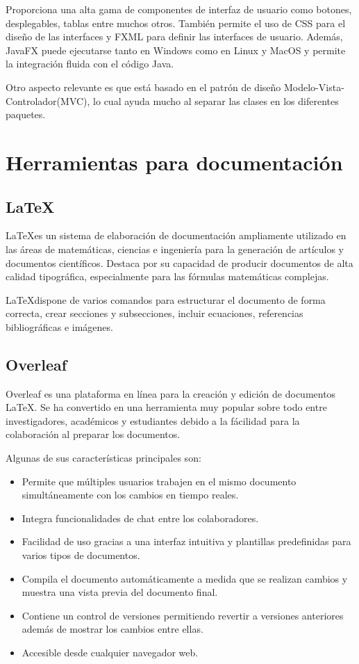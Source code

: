 Proporciona una alta gama de componentes de interfaz de usuario como botones, desplegables, tablas entre muchos otros. También permite el uso de CSS para el diseño de las interfaces y FXML para definir las interfaces de usuario. Además, JavaFX puede ejecutarse tanto en Windows como en Linux y MacOS y permite la integración fluida con el código Java.

Otro aspecto relevante es que está basado en el patrón de diseño Modelo-Vista-Controlador(MVC), lo cual ayuda mucho al separar las clases en los diferentes paquetes.

\section{Herramientas para documentación}

\subsection{\LaTeX}

\LaTeX es un sistema de elaboración de documentación ampliamente utilizado en las áreas de matemáticas, ciencias e ingeniería para la generación de artículos y documentos científicos. Destaca por su capacidad de producir documentos de alta calidad tipográfica, especialmente para las fórmulas matemáticas complejas.

\LaTeX dispone de varios comandos para estructurar el documento de forma correcta, crear secciones y subsecciones, incluir ecuaciones, referencias bibliográficas e imágenes.

\subsection{Overleaf}

Overleaf es una plataforma en línea para la creación y edición de documentos \LaTeX. Se ha convertido en una herramienta muy popular sobre todo entre investigadores, académicos y estudiantes debido a la fácilidad para la colaboración al preparar los documentos.

Algunas de sus características principales son:
\begin{itemize}
    \item Permite que múltiples usuarios trabajen en el mismo documento simultáneamente con los cambios en tiempo reales.
    \item Integra funcionalidades de chat entre los colaboradores.
    \item Facilidad de uso gracias a una interfaz intuitiva y plantillas predefinidas para varios tipos de documentos.
    \item Compila el documento automáticamente a medida que se realizan cambios y muestra una vista previa del documento final.
    \item Contiene un control de versiones permitiendo revertir a versiones anteriores además de mostrar los cambios entre ellas.
    \item Accesible desde cualquier navegador web.
\end{itemize}

